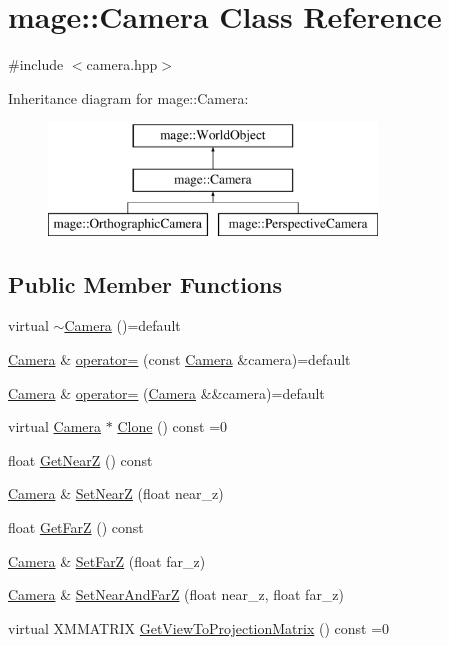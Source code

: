 \hypertarget{classmage_1_1_camera}{}\section{mage\+:\+:Camera Class Reference}
\label{classmage_1_1_camera}


{\ttfamily \#include $<$camera.\+hpp$>$}

Inheritance diagram for mage\+:\+:Camera\+:\begin{figure}[H]
\begin{center}
\leavevmode
\includegraphics[height=3.000000cm]{classmage_1_1_camera}
\end{center}
\end{figure}
\subsection*{Public Member Functions}
\begin{DoxyCompactItemize}
\item 
virtual \hyperlink{classmage_1_1_camera_a181f7fdf168c0d66022edfecb697dd7d}{$\sim$\+Camera} ()=default
\item 
\hyperlink{classmage_1_1_camera}{Camera} \& \hyperlink{classmage_1_1_camera_afe33e674f74180d6b9566a85eec51ac4}{operator=} (const \hyperlink{classmage_1_1_camera}{Camera} \&camera)=default
\item 
\hyperlink{classmage_1_1_camera}{Camera} \& \hyperlink{classmage_1_1_camera_a481f758a59564bb4074249f9bbf4e305}{operator=} (\hyperlink{classmage_1_1_camera}{Camera} \&\&camera)=default
\item 
virtual \hyperlink{classmage_1_1_camera}{Camera} $\ast$ \hyperlink{classmage_1_1_camera_a19301c2256c183db50b5e9406f7b5f3c}{Clone} () const =0
\item 
float \hyperlink{classmage_1_1_camera_a175e3c36526a8a3e28cd2f8bd1701c55}{Get\+NearZ} () const
\item 
\hyperlink{classmage_1_1_camera}{Camera} \& \hyperlink{classmage_1_1_camera_ae2e148f1ff5128442927abc87114a739}{Set\+NearZ} (float near\+\_\+z)
\item 
float \hyperlink{classmage_1_1_camera_a7f293a8711086b3419fe3b4224ff2778}{Get\+FarZ} () const
\item 
\hyperlink{classmage_1_1_camera}{Camera} \& \hyperlink{classmage_1_1_camera_acd1ab15368f052b846f72b92a52a94c5}{Set\+FarZ} (float far\+\_\+z)
\item 
\hyperlink{classmage_1_1_camera}{Camera} \& \hyperlink{classmage_1_1_camera_a8cb00dc1b8455197412c80f321011dc1}{Set\+Near\+And\+FarZ} (float near\+\_\+z, float far\+\_\+z)
\item 
virtual X\+M\+M\+A\+T\+R\+IX \hyperlink{classmage_1_1_camera_a1f5206864cf18b5548219492556df5d2}{Get\+View\+To\+Projection\+Matrix} () const =0
\end{DoxyCompactItemize}
